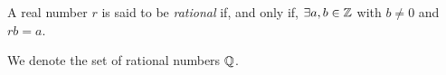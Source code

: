 \guard


\begin{defn}
\label{defn:rational}
  A real number $r$ is said to be \emph{rational} if, and only if, $\exists a,b\in\mathbb{Z}$ with $b\not=0$ and $rb= a$.
\end{defn}

We denote the set of rational numbers $\mathbb{Q}$.
